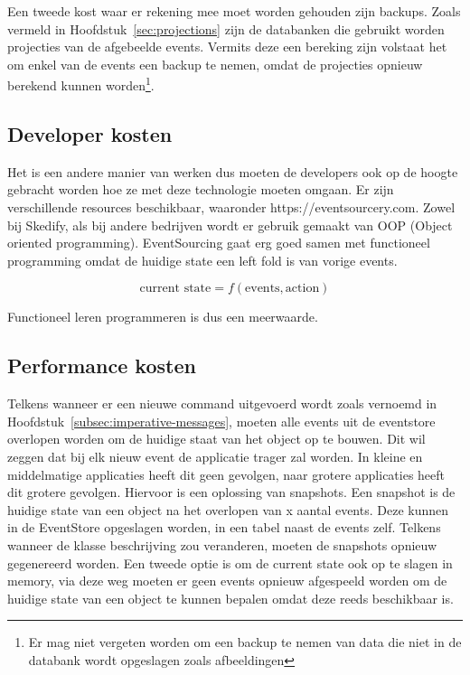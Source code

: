 Een tweede kost waar er rekening mee moet worden gehouden zijn backups. Zoals vermeld in Hoofdstuk~\ref{sec:projections} zijn de databanken die gebruikt worden projecties van de afgebeelde events. Vermits deze een bereking zijn volstaat het om enkel van de events een backup te nemen, omdat de projecties opnieuw berekend kunnen worden\footnote{Er mag niet vergeten worden om een backup te nemen van data die niet in de databank wordt opgeslagen zoals afbeeldingen}.

\subsection{Developer kosten}
\label{subsec:developer-kosten}

Het is een andere manier van werken dus moeten de developers ook op de hoogte gebracht worden hoe ze met deze technologie moeten omgaan. Er zijn verschillende resources beschikbaar, waaronder https://eventsourcery.com. Zowel bij Skedify, als bij andere bedrijven wordt er gebruik gemaakt van OOP (Object oriented programming). EventSourcing gaat erg goed samen met functioneel programming omdat de huidige state een left fold is van vorige events.

\begin{equation}
\text{current state} = f(\text{events}, \text{action})
\end{equation}

Functioneel leren programmeren is dus een meerwaarde.

\subsection{Performance kosten}
\label{subsec:performance-kosten}

Telkens wanneer er een nieuwe command uitgevoerd wordt zoals vernoemd in Hoofdstuk~\ref{subsec:imperative-messages}, moeten alle events uit de eventstore overlopen worden om de huidige staat van het object op te bouwen. Dit wil zeggen dat bij elk nieuw event de applicatie trager zal worden. In kleine en middelmatige applicaties heeft dit geen gevolgen, naar grotere applicaties heeft dit grotere gevolgen. Hiervoor is een oplossing van snapshots. Een snapshot is de huidige state van een object na het overlopen van x aantal events. Deze kunnen in de EventStore opgeslagen worden, in een tabel naast de events zelf. Telkens wanneer de klasse beschrijving zou veranderen, moeten de snapshots opnieuw gegenereerd worden. Een tweede optie is om de current state ook op te slagen in memory, via deze weg moeten er geen events opnieuw afgespeeld worden om de huidige state van een object te kunnen bepalen omdat deze reeds beschikbaar is.
